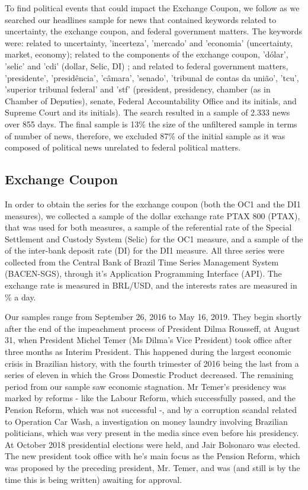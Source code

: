 \documentclass[cic,tc, english]{iiufrgs}
\begin{document}
    To find political events that could impact the Exchange Coupon, we follow \citet{bbb} as we searched our headlines sample for news that contained keywords related to uncertainty, the exchange coupon, and federal government matters. The keywords were: related to uncertainty, 'incerteza', 'mercado' and 'economia' (uncertainty, market, economy); related to the components of the exchange coupon, 'dólar', 'selic' and 'cdi' (dollar, Selic, DI) ; and related to federal government matters, 'presidente', 'presidência', 'câmara', 'senado', 'tribunal de contas da união', 'tcu', 'superior tribunal federal' and 'stf' (president, presidency, chamber (as in Chamber of Deputies), senate, Federal Accountability Office and its initials, and Supreme Court and its initials). The search resulted in a sample of 2.333 news over 855 days. The final sample is 13\% the size of the unfiltered sample in terms of number of news, therefore, we excluded 87\% of the initial sample as it was composed of political news unrelated to federal political matters.

\subsection{Exchange Coupon} \label{chapter_exchange_coupon}

    In order to obtain the series for the exchange coupon (both the OC1 and the DI1 measures), we collected a sample of the dollar exchange rate PTAX 800 (PTAX), that was used for both measures, a sample of the referential rate of the Special Settlement and Custody System (Selic) for the OC1 measure, and a sample of the of the inter-bank deposit rate (DI) for the DI1 measure. All three series were collected from the Central Bank of Brazil Time Series Management System (BACEN-SGS), through it's Application Programming Interface (API). The exchange rate is measured in BRL/USD, and the interests rates are measured in \% a day.
    
    Our samples range from September 26, 2016 to May 16, 2019. They begin shortly after the end of the impeachment process of President Dilma Rousseff, at August 31, when President Michel Temer (Ms Dilma's Vice President) took office after three months as Interim President. This happened during the largest economic crisis in Brazilian history, with the fourth trimester of 2016 being the last from a series of eleven in which the Gross Domestic Product decreased. The remaining period from our sample saw economic stagnation. Mr Temer's presidency was marked by reforms - like the Labour Reform, which successfully passed, and the Pension Reform, which was not successful -, and by a corruption scandal related to Operation Car Wash, a investigation on money laundry involving Brazilian politicians, which was very present in the media since even before his presidency. At October 2018 presidential elections were held, and Jair Bolsonaro was elected. The new president took office with he's main focus as the Pension Reform, which was proposed by the preceding president, Mr. Temer, and was (and still is by the time this is being written) awaiting for approval.
    
\end{document}
